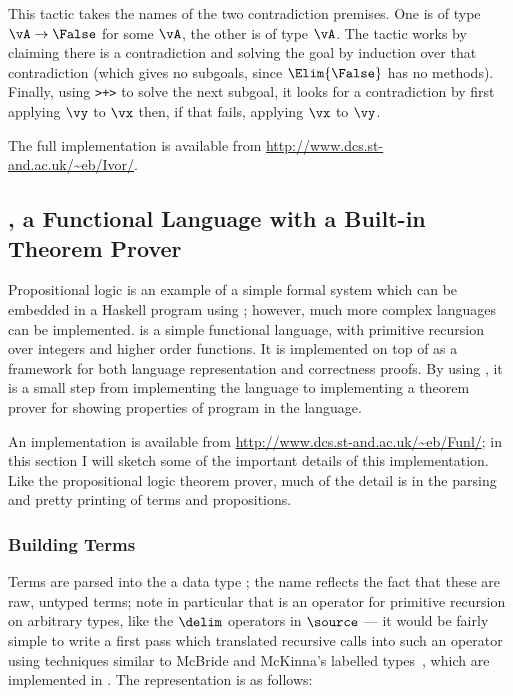 This tactic takes the names of the two contradiction premises. One is
of type $\vA\to\False$ for some $\vA$, the other is of type
$\vA$. The tactic works by claiming there is a contradiction and
solving the goal by induction over that contradiction (which gives no
subgoals, since $\Elim{\False}$ has no methods). Finally, using
\texttt{>+>} to solve the next subgoal, it looks for a contradiction
by first applying $\vy$ to $\vx$ then, if that fails, applying $\vx$
to $\vy$.

The full implementation is available from
\url{http://www.dcs.st-and.ac.uk/~eb/Ivor/}. 

\subsection{\Funl{}, a Functional Language with a Built-in Theorem Prover}

\label{example2}

Propositional logic is an example of a simple formal system which can
be embedded in a Haskell program using \Ivor{}; however, much more
complex languages can be implemented. \Funl{} is a simple functional
language, with primitive recursion over integers and higher order
functions. It is implemented on top of \Ivor{} as a framework for both
language representation and correctness proofs. By using \Ivor{}, it
is a small step from implementing the language to implementing a
theorem prover for showing properties of program in the language.

An implementation is available from
\url{http://www.dcs.st-and.ac.uk/~eb/Funl/}; in this section I will
sketch some of the important details of this implementation. Like the
propositional logic theorem prover, much of the detail is in the
parsing and pretty printing of terms and propositions.

\subsubsection{Building Terms}

Terms are parsed into the a data type ; the name
 reflects the fact that these are raw, untyped terms; note
in particular that  is an operator for primitive recursion
on arbitrary types, like the $\delim$ operators in $\source$ --- it
would be fairly simple to write a first pass which translated
recursive calls into such an operator using techniques similar to
McBride and McKinna's labelled types~\cite{view-left}, which are
implemented in \Ivor{}. The representation is as follows:

